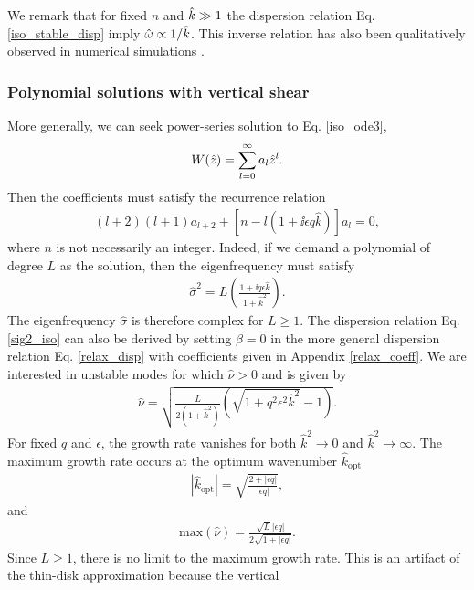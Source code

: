 We remark that for fixed $n$ and $\hat{k}\gg 1$ the dispersion relation 
Eq. \ref{iso_stable_disp} imply $\hat{\omega}\propto 1/\hat{k}$. This inverse relation 
has also been qualitatively observed in numerical simulations
\citep{stoll14}.  


\subsubsection{Polynomial solutions with vertical
  shear}\label{iso_poly}
More generally, we can seek power-series solution to
Eq. \ref{iso_ode3}, 
\begin{align}
  W(\hat{z}) = \sum_{l=0}^\infty a_l\hat{z}^l. 
\end{align}
Then the coefficients must satisfy the recurrence relation
\begin{align}
  (l+2)(l+1)a_{l+2} +
  \left[n - l\left(1+\ii \epsilon q  \hat{k}\right)\right] a_l = 0, 
\end{align}
where $n$ is not necessarily an integer. Indeed, if we demand
a polynomial of degree $L$ as the solution, then the eigenfrequency
must satisfy
\begin{align}\label{sig2_iso}
  \hat{\sigma}^2 = L\left(\frac{1+\ii q \epsilon
      \hat{k}}{1+\hat{k}^2}\right).
\end{align}
The eigenfrequency $\hat{\sigma}$ is therefore complex for
$L\geq1$. The dispersion relation Eq. \ref{sig2_iso} can also be
derived by setting $\beta=0$ in the more general dispersion relation 
Eq. \ref{relax_disp} with coefficients given in Appendix
\ref{relax_coeff}. We are interested in 
unstable modes for which $\hat{\nu}>0$ and is given by
\begin{align}\label{simple_growth}
  \hat{\nu} =\sqrt{
    \frac{L}{2\left(1+\hat{k}^2\right)}\left(\sqrt{1+q^2\epsilon^2\hat{k}^2} - 
      1\right)}. 
\end{align}
For fixed $q$ and $\epsilon$, the growth rate vanishes for both
$\hat{k}^2\to0$ and $\hat{k}^2\to\infty$. 
The maximum growth rate
occurs at the optimum wavenumber $\hat{k}_\mathrm{opt}$
\begin{align}
  |\hat{k}_\mathrm{opt}| = \sqrt{\frac{2+|\epsilon q|}{|\epsilon q|}},
\end{align}
and
\begin{align}
  \mathrm{max}\left(\hat{\nu}\right) =\frac{\sqrt{L}|\epsilon
    q|}{2\sqrt{1+|\epsilon q|}}. \label{iso_max_growth}
\end{align}
Since $L\geq1$, there is no limit to the maximum growth rate. This is
an artifact of the thin-disk approximation because the vertical 
